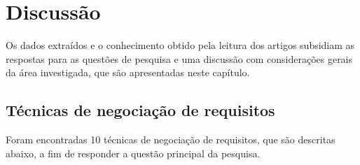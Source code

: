 \chapter{Discussão}\label{cap:discussao}

Os dados extraídos e o conhecimento obtido pela leitura dos
artigos subsidiam as respostas para as questões de pesquisa e uma
discussão com considerações gerais da área investigada, que são apresentadas
neste capítulo.

\section{Técnicas de negociação de requisitos}

Foram encontradas 10 técnicas de negociação de requisitos, que são descritas
abaixo, a fim de responder a questão principal da pesquisa.

